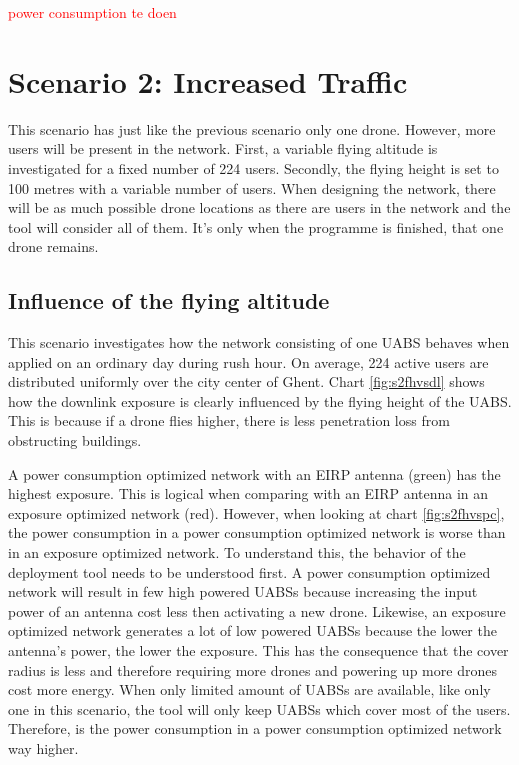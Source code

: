 \textcolor{red}{power consumption te doen}
\section{Scenario 2: Increased Traffic}

This scenario has just like the previous scenario only one drone. However, more users will be present in the network.
First, a variable flying altitude is investigated for a fixed number of 224 users. 
Secondly, the flying height is set to 100 metres with a variable number of users.
When designing the network, there will be as much possible drone locations as there are users in the network and the tool
will consider all of them. It's only when the programme is finished, that one drone remains.

\subsection{Influence of the flying altitude}
This scenario investigates how the network consisting of one \gls{UABS} behaves when applied on an ordinary day during rush hour. 
On average, 224 active users are distributed uniformly over the city center of Ghent. 
Chart \ref{fig:s2fhvsdl} shows how the downlink exposure is clearly influenced by the flying height of the \gls{UABS}. 
This is because if a drone flies higher, there is less penetration loss from obstructing buildings.

A power consumption optimized network with an \gls{EIRP} antenna (green) has the highest exposure. 
This is logical when comparing with an EIRP antenna in an exposure optimized network (red). 
However, when looking at chart \ref{fig:s2fhvspc}, the power consumption in a power consumption optimized network is worse 
than in an exposure optimized network. To understand this, the behavior of the deployment tool needs to be understood first. 
A power consumption optimized network will result in few high powered \gls{UABS}s because increasing the input power of an antenna cost 
less then activating a new  drone. Likewise, an exposure optimized network 
generates a lot of low powered \gls{UABS}s because the lower the antenna's power, the lower the exposure. This has the consequence that the cover radius 
is less and therefore requiring more drones and powering up more drones cost more energy.
When only limited amount of \gls{UABS}s are available, 
like only one in this scenario, the tool will only keep \gls{UABS}s which cover most of the users. 
Therefore, is the power consumption in a power consumption optimized network way higher. 


